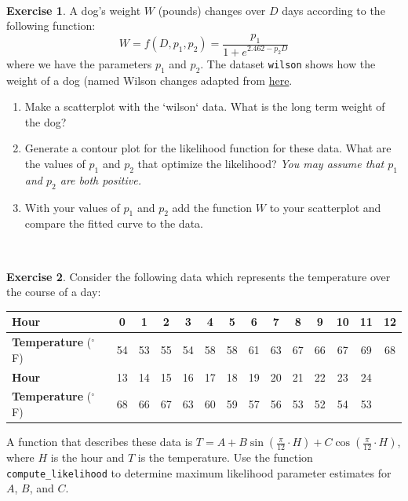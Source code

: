 \documentclass[
]{book}
\theoremstyle{definition}
\theoremstyle{definition}
\theoremstyle{definition}
\newtheorem{exercise}{Exercise}[chapter]
\theoremstyle{remark}
\begin{document}
~

\begin{exercise}
\protect\hypertarget{exr:unnamed-chunk-173}{}{\label{exr:unnamed-chunk-173} }A dog's weight \(W\) (pounds) changes over \(D\) days according to the following function:
\begin{equation}
W =f(D,p_{1},p_{2})= \frac{p_{1}}{1+e^{2.462-p_{2}D}}
\end{equation}
where we have the parameters \(p_{1}\) and \(p_{2}\). The dataset \texttt{wilson} shows how the weight of a dog (named Wilson changes adapted from \href{http://bscheng.com/2014/05/07/modeling-logistic-growth-data-in-r/}{here}.

\begin{enumerate}[label=\alph*.]
\item Make a scatterplot with the `wilson` data.  What is the long term weight of the dog? 
\item Generate a contour plot for the likelihood function for these data.  What are the values of $p_{1}$ and $p_{2}$ that optimize the likelihood?  \emph{You may assume that $p_{1}$ and $p_{2}$ are both positive.}
\item With your values of $p_{1}$ and $p_{2}$ add the function $W$ to your scatterplot and compare the fitted curve to the data.
\end{enumerate}
\end{exercise}

~

\begin{exercise}
\protect\hypertarget{exr:unnamed-chunk-174}{}{\label{exr:unnamed-chunk-174} }
Consider the following data which represents the temperature over the course of a day:

\begin{tabular}{lccccccccccccc}
\textbf{Hour} & 0 & 1 & 2 & 3 & 4 & 5 & 6 & 7 & 8 & 9 &10 &11 &12  \\ \hline
\textbf{Temperature} ($^{\circ}$F) 
& 54 &53 &55& 54& 58& 58 &61& 63 &67& 66& 67& 69& 68 \\ \hline \hline
\textbf{Hour} &13 &14 &15 &16 &17 &18 &19 &20& 21& 22& 23& 24 & \\
\textbf{Temperature} ($^{\circ}$F) &
 68& 66& 67& 63& 60& 59& 57& 56& 53& 52& 54& 53 & \\ \hline
\end{tabular}

A function that describes these data is \(\displaystyle T = A + B \sin \left( \frac{\pi}{12} \cdot H \right) + C \cos \left( \frac{\pi}{12} \cdot H \right)\), where \(H\) is the hour and \(T\) is the temperature. Use the function \texttt{compute\_likelihood} to determine maximum likelihood parameter estimates for \(A\), \(B\), and \(C\).
\end{exercise}
\end{document}
